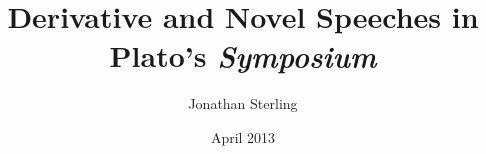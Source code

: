 \documentclass[letterpaper, 12pt]{article}
\begin{document}
\doublespacing

\author{Jonathan Sterling}

\title{Derivative and Novel Speeches in Plato's \emph{Symposium}}
\date{April 2013}
\maketitle


\nocite{1985plato}


\end{document}
